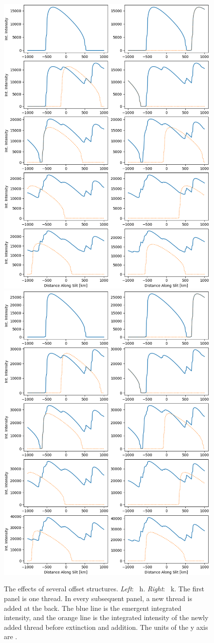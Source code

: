 \begin{figure}
    \includegraphics[width=0.49\linewidth]{./03Modelling2D/figs/Offset/MgIIh_slit.png} \hspace{1pt}\vline\hspace{1pt}
    \includegraphics[width=0.49\linewidth]{./03Modelling2D/figs/Offset/MgIIk_slit.png}
    \caption[The effects of several offset structures.]{The effects of several offset structures. \textit{Left}: \mgii~h. \textit{Right}: \mgii~k. The first panel is one thread. In every subsequent panel, a new thread is added at the back. The blue line is the emergent integrated intensity, and the orange line is the integrated intensity of the newly added thread before extinction and addition. The units of the y axis are \cgsintint.}
    \label{fig:like8inlr2016}
\end{figure}

